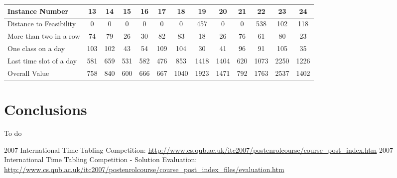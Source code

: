 \documentclass{llncs}
\begin{document}
\begin{tabular}{l  *{12}{c}}
Instance Number & 13 & 14 & 15 & 16 & 17 & 18 & 19 & 20 & 21 & 22 & 23 & 24 \\
\toprule
Distance to Feasibility & 0 & 0 & 0 & 0 & 0 & 0 & 457 & 0 & 0 & 538 & 102 & 118 \\
More than two in a row & 74 & 79 & 26 & 30 & 82 & 83 & 18 & 26 & 76 & 61 & 80 & 23 \\
One class on a day  & 103 & 102 & 43 & 54 & 109 & 104 & 30 & 41 & 96 & 91 & 105 & 35 \\
Last time slot of a day & 581 & 659 & 531 & 582 & 476 & 853 & 1418 & 1404 & 620 & 1073 & 2250 & 1226 \\
\bottomrule
Overall Value & 758 & 840 & 600 & 666 & 667 & 1040 & 1923 & 1471 & 792 & 1763 & 2537 & 1402 \\


\end{tabular}

\medskip%

\section{Conclusions}

To do

\begin{thebibliography}{9}

2007 International Time Tabling Competition:
\url{http://www.cs.qub.ac.uk/itc2007/postenrolcourse/course_post_index.htm}
2007 International Time Tabling Competition - Solution Evaluation:
\url{http://www.cs.qub.ac.uk/itc2007/postenrolcourse/course_post_index_files/evaluation.htm}


\end{thebibliography}
\end{document}

